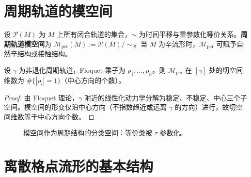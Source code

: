 \section{周期轨道的模空间}\label{sec:periodic_orbit_moduli}

\begin{definition}[周期轨道模空间]\label{def:periodic_orbit_moduli}
设 $\mathcal{P}(M)$ 为 $M$ 上所有闭合轨道的集合，$\sim$ 为时间平移与重参数化等价关系。\textbf{周期轨道模空间}为 $\mathcal{M}_{\text{per}}(M):=\mathcal{P}(M)/\sim$。当 $M$ 为辛流形时，$\mathcal{M}_{\text{per}}$ 可赋予自然辛结构或接触结构。
\end{definition}

\begin{proposition}[模空间的切空间]\label{prop:moduli_tangent}
设 $\gamma$ 为非退化周期轨道，Floquet 乘子为 $\rho_1,\dots,\rho_n$。则 $\mathcal{M}_{\text{per}}$ 在 $[\gamma]$ 处的切空间维数为 $\#\{|\rho_i|=1\}$（中心方向的个数）。
\end{proposition}

\begin{proof}
由 Floquet 理论，$\gamma$ 附近的线性化动力学分解为稳定、不稳定、中心三个子空间。模空间的形变仅沿中心方向（不指数趋近或远离 $\gamma$ 的方向）进行，故切空间维数等于中心方向个数。
\end{proof}



\begin{figure}[htbp]
\centering
{}
\caption{模空间作为周期结构的分类空间：等价类被 $\tau$ 参数化。}
\label{fig:moduli_space_periodic}
\end{figure}

\section{离散格点流形的基本结构}\label{sec:discrete_lattice}

